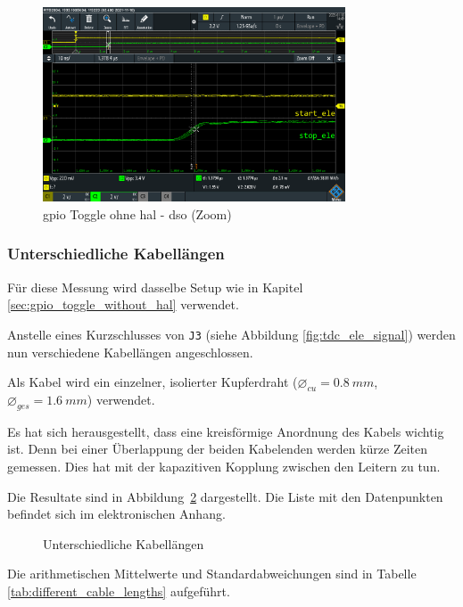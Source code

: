 \begin{figure}[H]
    \centering
    \includegraphics[width=0.8\textwidth]{graphics/gpio_toggle_without_hal_dso_zoom.png}
    \caption{\acrshort{gpio} Toggle ohne \acrshort{hal} - \acrshort{dso} (Zoom)}\label{fig:gpio_toggle_without_hal_dso_zoom}
\end{figure}

\subsubsection{Unterschiedliche Kabellängen}\label{sec:different_cable_lengths}

Für diese Messung wird dasselbe Setup wie in Kapitel \ref{sec:gpio_toggle_without_hal} verwendet.

Anstelle eines Kurzschlusses von \lstinline|J3| (siehe Abbildung \ref{fig:tdc_ele_signal}) werden nun verschiedene
Kabellängen angeschlossen.

Als Kabel wird ein einzelner, isolierter Kupferdraht ($\diameter_{cu} = 0.8~mm$, $\diameter_{ges} = 1.6~mm$) verwendet.

Es hat sich herausgestellt, dass eine kreisförmige Anordnung des Kabels wichtig ist. Denn bei einer Überlappung der
beiden Kabelenden werden kürze Zeiten gemessen. Dies hat mit der kapazitiven Kopplung zwischen den Leitern zu tun.

Die Resultate sind in Abbildung~\ref{fig:different_cable_lengths} dargestellt. Die Liste mit den Datenpunkten befindet
sich im elektronischen Anhang.

\begin{figure}[H]
    \centering
    
    \caption{Unterschiedliche Kabellängen}\label{fig:different_cable_lengths}
\end{figure}

Die arithmetischen Mittelwerte und Standardabweichungen sind in Tabelle \ref{tab:different_cable_lengths} aufgeführt.

